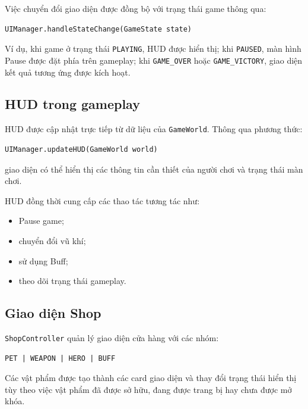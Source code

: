 \documentclass[12pt,a4paper]{report}
\begin{document}
    Việc chuyển đổi giao diện được đồng bộ với trạng thái game thông qua:

    \begin{verbatim}
UIManager.handleStateChange(GameState state)
    \end{verbatim}

    Ví dụ, khi game ở trạng thái \texttt{PLAYING}, HUD được hiển thị;
    khi \texttt{PAUSED}, màn hình Pause được đặt phía trên gameplay;
    khi \texttt{GAME\_OVER} hoặc \texttt{GAME\_VICTORY}, giao diện kết
    quả tương ứng được kích hoạt.

    \subsection{HUD trong gameplay}

    HUD được cập nhật trực tiếp từ dữ liệu của \texttt{GameWorld}.
    Thông qua phương thức:

    \begin{verbatim}
UIManager.updateHUD(GameWorld world)
    \end{verbatim}

    giao diện có thể hiển thị các thông tin cần thiết của người chơi
    và trạng thái màn chơi.

    HUD đồng thời cung cấp các thao tác tương tác như:

    \begin{itemize}
        \item Pause game;
        \item chuyển đổi vũ khí;
        \item sử dụng Buff;
        \item theo dõi trạng thái gameplay.
    \end{itemize}

    \subsection{Giao diện Shop}

    \texttt{ShopController} quản lý giao diện cửa hàng với các nhóm:

    \begin{verbatim}
PET | WEAPON | HERO | BUFF
    \end{verbatim}

    Các vật phẩm được tạo thành các card giao diện và thay đổi trạng thái
    hiển thị tùy theo việc vật phẩm đã được sở hữu, đang được trang bị
    hay chưa được mở khóa.
\end{document}
